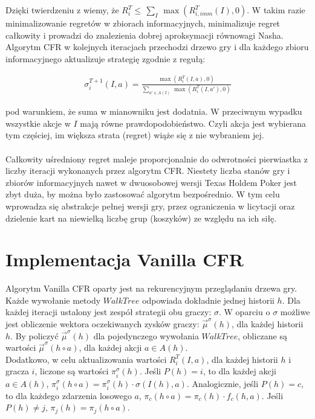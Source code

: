 \documentclass[licencjacka]{pracamgr}
\begin{document}
\noindent
Dzięki twierdzeniu z \cite{cfr} wiemy, że $R_i^T \leq \, \sum_{I} \, \max(R_{i, imm}^T(I), 0)$. W takim razie
minimalizowanie regretów w zbiorach informacyjnych, minimalizuje regret całkowity i prowadzi do znalezienia
dobrej aproksymacji równowagi Nasha. \\

\noindent
Algorytm CFR w kolejnych iteracjach przechodzi drzewo gry i dla każdego zbioru informacyjnego aktualizuje strategię
zgodnie z regułą:

\begin{align*}
\sigma_i^{T+1} (I, a) = \frac{\max(R_i^T(I, a), 0)}{\sum\limits_{a' \in A(I)} \, \max(R_i^T(I, a'), 0)}
\end{align*}

\noindent
pod warunkiem, że suma w mianowniku jest dodatnia. W przeciwnym wypadku wszystkie akcje w $I$ mają równe prawdopodobieństwo.
Czyli akcja jest wybierana tym częściej, im większa strata (regret) wiąże się z nie wybraniem jej.\\\\

\noindent
Całkowity uśredniony regret maleje proporcjonalnie do odwrotności pierwiastka z liczby iteracji wykonanych przez algorytm CFR. Niestety
liczba stanów gry i zbiorów informacyjnych nawet w dwuosobowej wersji Texas Holdem Poker jest zbyt duża, by można było
zastosować algorytm bezpośrednio. W tym celu wprowadza się abstrakcje pełnej wersji gry, przez ograniczenia w licytacji
oraz dzielenie kart na niewielką liczbę grup (koszyków) ze względu na ich siłę. \\

\section{Implementacja Vanilla CFR}

\noindent
Algorytm Vanilla CFR oparty jest na rekurencyjnym przeglądaniu drzewa gry. Każde wywołanie metody $WalkTree$ odpowiada dokładnie jednej
historii $h$. Dla każdej iteracji ustalony jest zespół strategii obu
graczy: $\sigma$. W oparciu o $\sigma$ możliwe jest obliczenie wektora oczekiwanych zysków graczy: $\vec{\mu}^{\sigma}(h)$, dla każdej historii $h$.
By policzyć $\vec{\mu}^{\sigma}(h)$ dla pojedynczego wywołania $WalkTree$, obliczane są wartości $\vec{\mu}^{\sigma}(h \circ a)$, dla każdej
akcji $a \in A(h)$. \\ 

\noindent
Dodatkowo, w celu aktualizowania wartości $R_i^T(I, a)$, dla każdej historii $h$ i gracza $i$, liczone są wartości $\pi_i^{\sigma}(h)$.
Jeśli $P(h) = i$, to dla każdej akcji $a \in A(h)$, $\pi_i^{\sigma}(h \circ a) = \pi_i^{\sigma}(h) \cdot \sigma(I(h), a)$.
Analogicznie, jeśli $P(h) = c$, to dla każdego zdarzenia losowego $a$, $\pi_c(h \circ a) = \pi_c(h) \cdot f_c(h, a)$.
Jeśli $P(h) \neq j$, $\pi_j(h) = \pi_j(h \circ a)$. \\
\end{document}
